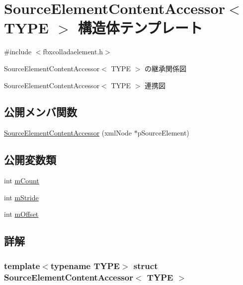 \hypertarget{struct_source_element_content_accessor}{}\section{Source\+Element\+Content\+Accessor$<$ T\+Y\+PE $>$ 構造体テンプレート}
\label{struct_source_element_content_accessor}


{\ttfamily \#include $<$fbxcolladaelement.\+h$>$}



Source\+Element\+Content\+Accessor$<$ T\+Y\+PE $>$ の継承関係図


Source\+Element\+Content\+Accessor$<$ T\+Y\+PE $>$ 連携図
\subsection*{公開メンバ関数}
\begin{DoxyCompactItemize}
\item 
\hyperlink{struct_source_element_content_accessor_a6eb54cec39e924a3309beb5baefbde93}{Source\+Element\+Content\+Accessor} (xml\+Node $\ast$p\+Source\+Element)
\end{DoxyCompactItemize}
\subsection*{公開変数類}
\begin{DoxyCompactItemize}
\item 
int \hyperlink{struct_source_element_content_accessor_a21c1d4a1c15abe58b0fe1d4114c81f39}{m\+Count}
\item 
int \hyperlink{struct_source_element_content_accessor_af3895bda51b49a9086b11eaa7012ee2d}{m\+Stride}
\item 
int \hyperlink{struct_source_element_content_accessor_a1450ec3072e82c51aacd05fc21d15546}{m\+Offset}
\end{DoxyCompactItemize}


\subsection{詳解}
\subsubsection*{template$<$typename T\+Y\+PE$>$\newline
struct Source\+Element\+Content\+Accessor$<$ T\+Y\+P\+E $>$}

